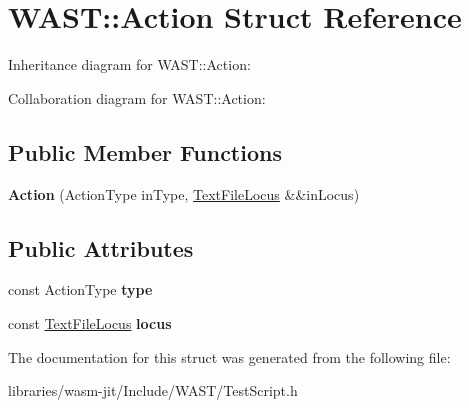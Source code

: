 \hypertarget{struct_w_a_s_t_1_1_action}{}\section{W\+A\+ST\+:\+:Action Struct Reference}
\label{struct_w_a_s_t_1_1_action}


Inheritance diagram for W\+A\+ST\+:\+:Action\+:


Collaboration diagram for W\+A\+ST\+:\+:Action\+:
\subsection*{Public Member Functions}
\begin{DoxyCompactItemize}
\item 
\mbox{\label{struct_w_a_s_t_1_1_action_aac7d30058fa131ab6f8827980f079a10}} 
{\bfseries Action} (Action\+Type in\+Type, \mbox{\hyperlink{struct_w_a_s_t_1_1_text_file_locus}{Text\+File\+Locus}} \&\&in\+Locus)
\end{DoxyCompactItemize}
\subsection*{Public Attributes}
\begin{DoxyCompactItemize}
\item 
\mbox{\label{struct_w_a_s_t_1_1_action_a67e4f46e3021e93b3d38a97cc86254cc}} 
const Action\+Type {\bfseries type}
\item 
\mbox{\label{struct_w_a_s_t_1_1_action_af67c1490eebb9ee56eeba36960cfe4d7}} 
const \mbox{\hyperlink{struct_w_a_s_t_1_1_text_file_locus}{Text\+File\+Locus}} {\bfseries locus}
\end{DoxyCompactItemize}


The documentation for this struct was generated from the following file\+:\begin{DoxyCompactItemize}
\item 
libraries/wasm-\/jit/\+Include/\+W\+A\+S\+T/Test\+Script.\+h\end{DoxyCompactItemize}
